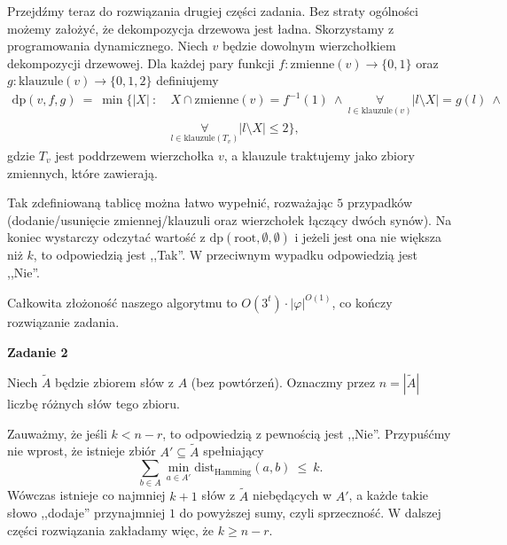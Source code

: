 \documentclass[12pt]{article}
\begin{document}
	\medskip
	
	Przejdźmy teraz do rozwiązania drugiej części zadania. Bez straty ogólności
	możemy założyć, że dekompozycja drzewowa jest ładna. Skorzystamy z
	programowania dynamicznego. Niech \(v\) będzie dowolnym wierzchołkiem
	dekompozycji drzewowej. Dla każdej pary funkcji \(f : \text{zmienne}(v) \to
	\{0, 1\}\) oraz \(g : \text{klauzule}(v) \to \{0, 1, 2\}\) definiujemy
	\begin{align*}
		\text{dp}(v, f, g) \ = \ \min \bigg\{ |X| \ : \ &X \cap
		\text{zmienne}(v) = f^{-1}(1) \ \wedge \ \underset{l \in
		\text{klauzule}(v)}{\forall} |l	\setminus X| = g(l) \ \wedge \\
		&\underset{l \in \text{klauzule}(T_{v})}{\forall} |l \setminus X|
		\leqslant 2 \bigg\} \text{,}
	\end{align*}
	gdzie \(T_{v}\) jest poddrzewem wierzchołka \(v\), a klauzule traktujemy
	jako zbiory zmiennych, które zawierają.
	
	\medskip
	
	Tak zdefiniowaną tablicę można łatwo wypełnić, rozważając \(5\) przypadków
	(dodanie/usunięcie zmiennej/klauzuli oraz wierzchołek łączący dwóch synów).
	Na koniec wystarczy odczytać wartość z \(\text{dp}(\text{root}, \emptyset,
	\emptyset)\) i jeżeli jest ona nie większa niż \(k\), to odpowiedzią jest
	,,Tak''. W przeciwnym wypadku odpowiedzią jest ,,Nie''.
	
	\medskip
	
	Całkowita złożoność naszego algorytmu to \(O(3^{t}) \cdot
	|\varphi|^{O(1)}\), co kończy rozwiązanie zadania.
	
	\newpage
	
	\textbf{Zadanie 2}
	
	\medskip
	
	Niech \(\tilde{A}\) będzie zbiorem słów z \(A\) (bez powtórzeń). Oznaczmy
	przez \(n = |\tilde{A}|\) liczbę różnych słów tego zbioru.
	
	\medskip
	
	Zauważmy, że jeśli \(k < n - r\), to odpowiedzią z pewnością jest ,,Nie''.
	Przypuśćmy nie wprost, że istnieje zbiór \(A' \subseteq \tilde{A}\)
	spełniający
	\[ \sum\limits_{b \in A} \min_{a \in A'} \text{dist}_{\text{Hamming}} (a, b)
	\ \leqslant \ k \text{.} \]
	Wówczas istnieje co najmniej \(k + 1\) słów z \(\tilde{A}\) niebędących w
	\(A'\), a każde takie słowo ,,dodaje'' przynajmniej \(1\) do powyższej sumy,
	czyli sprzeczność. W dalszej części rozwiązania zakładamy więc, że \(k
	\geqslant n - r\).
	
\end{document}
